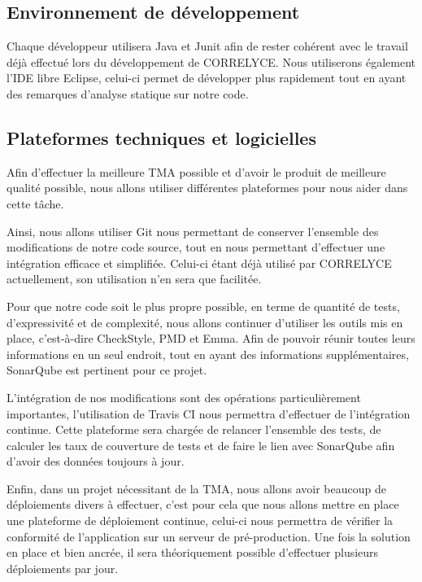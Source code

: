 	\subsection{Environnement de développement}
	Chaque développeur utilisera Java et Junit afin de rester cohérent avec le travail déjà effectué lors du développement de CORRELYCE. Nous utiliserons également l’IDE libre Eclipse, celui-ci permet de développer plus rapidement tout en ayant des remarques d’analyse statique sur notre code.
	
	\subsection{Plateformes techniques et logicielles}
	Afin d’effectuer la meilleure TMA possible et d’avoir le produit de meilleure qualité possible, nous allons utiliser différentes plateformes pour nous aider dans cette tâche. 
	
	Ainsi, nous allons utiliser Git nous permettant de conserver l’ensemble des modifications de notre code source, tout en nous permettant d’effectuer une intégration efficace et simplifiée.
	Celui-ci étant déjà utilisé par CORRELYCE actuellement, son utilisation n’en sera que facilitée.
	
	Pour que notre code soit le plus propre possible, en terme de quantité de tests, d’expressivité et de complexité, nous allons continuer d’utiliser les outils mis en place, c’est-à-dire CheckStyle, PMD et Emma. Afin de pouvoir réunir toutes leurs informations en un seul endroit, tout en ayant des informations supplémentaires, SonarQube est pertinent pour ce projet.
	
	L’intégration de nos modifications sont des opérations particulièrement importantes, l’utilisation de Travis CI nous permettra d’effectuer de l’intégration continue. Cette plateforme sera chargée de relancer l’ensemble des tests, de calculer les taux de couverture de tests et de faire le lien avec SonarQube afin d’avoir des données toujours à jour.
	
	Enfin, dans un projet nécessitant de la TMA, nous allons avoir beaucoup de déploiements divers à effectuer, c’est pour cela que nous allons mettre en place une plateforme de déploiement continue, celui-ci nous permettra de vérifier la conformité de l’application sur un serveur de pré-production.
	Une fois la solution en place et bien ancrée, il sera théoriquement possible d’effectuer plusieurs déploiements par jour.
	
	
